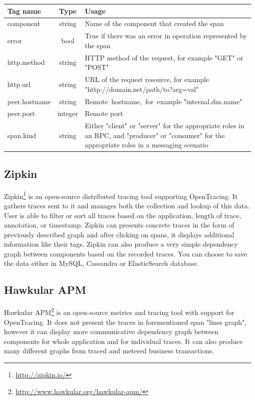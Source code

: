 \documentclass[12pt,oneside]{fithesis2}
\begin{document}
\begin{flushleft}
\renewcommand{\arraystretch}{1.65}
\begin{tabular}{| l | c | p{8cm} |}
\hline
\textbf{Tag name} & \textbf{Type} & \textbf{Usage} \\ \hline
component & string & Name of the component that created the span \\ \hline
error & bool & True if there was an error in operation represented by the span \\ \hline
http.method & string & HTTP method of the request, for example "GET" or "POST" \\ \hline
http.url & string & URL of the request resource, for example "http://domain.net/path/to?arg=val" \\ \hline
peer.hostname & string & \mbox{Remote hostname, for example} \mbox{"internal.dns.name"} \\ \hline
peer.port & integer & Remote port \\ \hline
span.kind & string & Either "client" or "server" for the appropriate roles in an RPC, and "producer" or \mbox{"consumer"} for the appropriate roles in a messaging scenario \\ \hline
\end{tabular}
\end{flushleft}

\subsection{Zipkin}

Zipkin\footnote{\url{http://zipkin.io/}} is an open-source distributed tracing tool supporting OpenTracing. It gathers traces sent to it and manages both the collection and lookup of this data. User is able to filter or sort all traces based on the application, length of trace, annotation, or timestamp. Zipkin can presents concrete traces in the form of previously described graph and after clicking on spans, it displays additional information like their tags. Zipkin can also produce a very simple dependency graph between components based on the recorded traces. You can choose to save the data either in MySQL, Cassandra or ElasticSearch database.

\subsection{Hawkular APM}

Hawkular APM\footnote{\url{http://www.hawkular.org/hawkular-apm/}} is an open-source metrics and tracing tool with support for OpenTracing. It does not present the traces in forementioned span "lines graph", however it can display more communicative dependency graph between components for whole application and for individual traces. It can also produce many different graphs from traced and metered business transactions.
\end{document}
